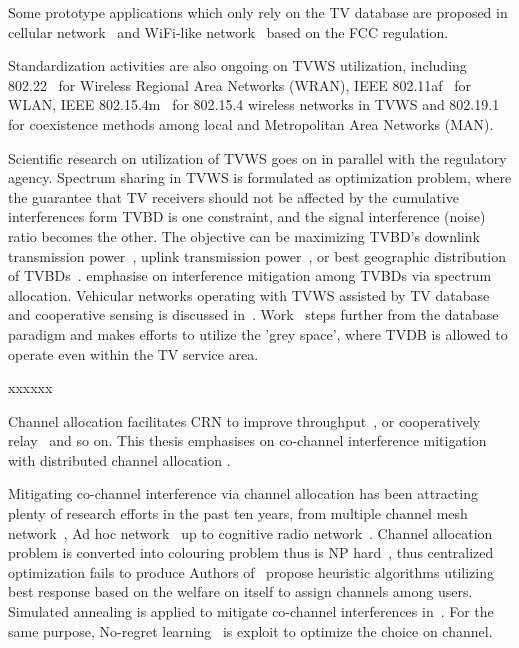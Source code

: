 Some prototype applications which only rely on the TV database are proposed in cellular network~\cite{tvwhite_lte2011, multicell_geo_dyspan11} and WiFi-like network~\cite{whitefi09} based on the FCC regulation.

Standardization activities are also ongoing on TVWS utilization, including 802.22~\cite{802.22} for Wireless Regional Area Networks (WRAN), IEEE 802.11af~\cite{802.11af} for WLAN, IEEE 802.15.4m~\cite{802.15.4m} for 802.15.4 wireless networks in TVWS and 802.19.1~\cite{802.19} for coexistence methods among local and Metropolitan Area Networks (MAN).


Scientific research on utilization of TVWS goes on in parallel with the regulatory agency.
Spectrum sharing in TVWS is formulated as optimization problem, where the guarantee that TV receivers should not be affected by the cumulative interferences form TVBD is one constraint, and the signal interference (noise) ratio becomes the other.
The objective can be maximizing TVBD's downlink transmission power~\cite{multipleIntf_pimrc11}, uplink transmission power~\cite{uplink_power_tvws13}, or best geographic distribution of TVBDs~\cite{withinTVcoverage_PIMRC13}.
\cite{game_CA_association_ICDCS12,SA_CA_TVWS_2012crowncom, 802.22co-existence09, 802.22game_08globecom,self-coexistenceWRAN2010infocom} emphasise on interference mitigation among TVBDs via spectrum allocation.
Vehicular networks operating with TVWS assisted by TV database and cooperative sensing is discussed in~\cite{tvws_vtc13}.
Work~\cite{increaseTVWS12} steps further from the database paradigm and makes efforts to utilize the 'grey space', where TVDB is allowed to operate even within the TV service area.



xxxxxx

Channel allocation facilitates CRN to improve throughput~\cite{channelAllocation_throughput_12wcnc}, or cooperatively relay~\cite{channelAllocation_relay_2010ICASSP} and so on.
This thesis emphasises on co-channel interference mitigation with distributed channel allocation . 

Mitigating co-channel interference via channel allocation has been attracting plenty of research efforts in the past ten years, from multiple channel mesh network~\cite{Hyacinth}, Ad hoc network~\cite{Babadi08, Ko_DistributedCA} up to cognitive radio network~\cite{SA_CA_TVWS_2012crowncom,qlearning_huang}. 
Channel allocation problem is converted into colouring problem thus is NP hard~\cite{Hyacinth}, thus centralized optimization fails to produce
Authors of~\cite{Babadi08, Ko_DistributedCA} propose heuristic algorithms utilizing best response based on the welfare on itself to assign channels among users.
Simulated annealing is applied to mitigate co-channel interferences in~\cite{SA_CA_TVWS_2012crowncom}.
For the same purpose, No-regret learning~\cite{qlearning_huang, hart00correlatedeq} is exploit to optimize the choice on channel.

